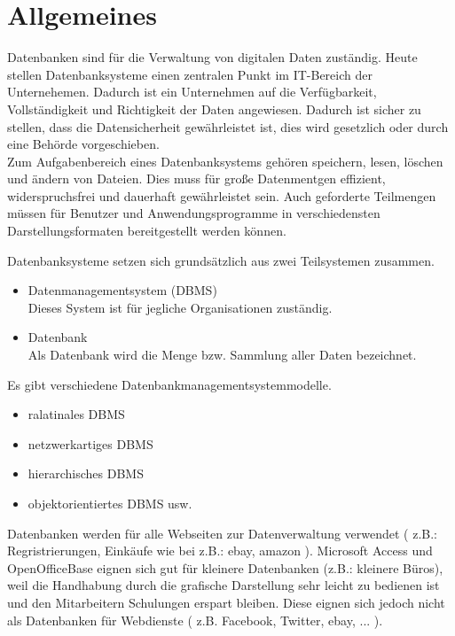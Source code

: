 \documentclass[11pt,a4paper]{report}
\begin{document}
\section{Allgemeines}
Datenbanken sind für die Verwaltung von digitalen Daten zuständig. Heute stellen Datenbanksysteme einen zentralen Punkt im IT-Bereich der Unternehemen. Dadurch ist ein Unternehmen auf die Verfügbarkeit, Vollständigkeit und Richtigkeit der Daten angewiesen. Dadurch ist sicher zu stellen, dass die Datensicherheit gewährleistet ist, dies wird gesetzlich oder durch eine Behörde vorgeschieben.\\

Zum Aufgabenbereich eines Datenbanksystems gehören speichern, lesen, löschen und ändern von Dateien. Dies muss für große Datenmentgen effizient, widerspruchsfrei und dauerhaft gewährleistet sein. Auch geforderte Teilmengen müssen für Benutzer und Anwendungsprogramme in verschiedensten Darstellungsformaten bereitgestellt werden können.

Datenbanksysteme setzen sich grundsätzlich aus zwei Teilsystemen zusammen.

\begin{itemize}
\item Datenmanagementsystem (DBMS)\\
Dieses System ist für jegliche Organisationen zuständig.
\item Datenbank\\
Als Datenbank wird die Menge bzw. Sammlung aller Daten bezeichnet.
\end{itemize} 

Es gibt verschiedene Datenbankmanagementsystemmodelle.
\begin{itemize}
\item ralatinales DBMS
\item netzwerkartiges DBMS
\item hierarchisches DBMS
\item objektorientiertes DBMS usw.
\end{itemize}

Datenbanken werden für alle Webseiten zur Datenverwaltung verwendet ( z.B.: Regristrierungen, Einkäufe wie bei z.B.: ebay, amazon ).
Microsoft Access und OpenOfficeBase eignen sich gut für kleinere Datenbanken (z.B.: kleinere Büros), weil die Handhabung durch die grafische Darstellung sehr leicht zu bedienen ist und den Mitarbeitern Schulungen erspart bleiben.
Diese eignen sich jedoch nicht als Datenbanken für Webdienste ( z.B. Facebook, Twitter, ebay, ... ).\\
\end{document}
